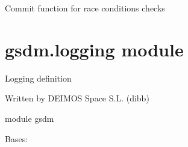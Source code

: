 
\begin{fulllineitems}
\label{\detokenize{gsdm:gsdm.debugging.race_condition}}
Commit function for race conditions checks

\end{fulllineitems}



\section{gsdm.logging module}
\label{\detokenize{gsdm:module-gsdm.logging}}\label{\detokenize{gsdm:gsdm-logging-module}}
Logging definition

Written by DEIMOS Space S.L. (dibb)

module gsdm

\begin{fulllineitems}
\label{\detokenize{gsdm:gsdm.logging.Log}}
Bases: 

\begin{fulllineitems}
\label{\detokenize{gsdm:gsdm.logging.Log.define_logging_configuration}}
\end{fulllineitems}


\end{fulllineitems}



